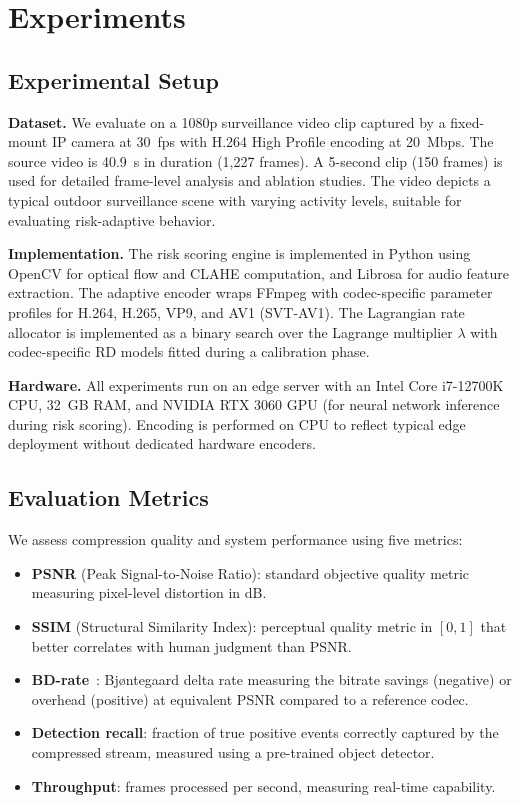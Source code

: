 \section{Experiments}
\label{sec:experiments}

\subsection{Experimental Setup}

\textbf{Dataset.} We evaluate on a 1080p surveillance video clip captured by a fixed-mount IP camera at 30~fps with H.264 High Profile encoding at 20~Mbps. The source video is 40.9~s in duration (1{,}227 frames). A 5-second clip (150 frames) is used for detailed frame-level analysis and ablation studies. The video depicts a typical outdoor surveillance scene with varying activity levels, suitable for evaluating risk-adaptive behavior.

\textbf{Implementation.} The risk scoring engine is implemented in Python using OpenCV for optical flow and CLAHE computation, and Librosa for audio feature extraction. The adaptive encoder wraps FFmpeg with codec-specific parameter profiles for H.264, H.265, VP9, and AV1 (SVT-AV1). The Lagrangian rate allocator is implemented as a binary search over the Lagrange multiplier $\lambda$ with codec-specific RD models fitted during a calibration phase.

\textbf{Hardware.} All experiments run on an edge server with an Intel Core i7-12700K CPU, 32~GB RAM, and NVIDIA RTX 3060 GPU (for neural network inference during risk scoring). Encoding is performed on CPU to reflect typical edge deployment without dedicated hardware encoders.

\subsection{Evaluation Metrics}

We assess compression quality and system performance using five metrics:

\begin{itemize}
    \item \textbf{PSNR} (Peak Signal-to-Noise Ratio): standard objective quality metric measuring pixel-level distortion in dB.
    \item \textbf{SSIM} (Structural Similarity Index): perceptual quality metric in $[0, 1]$ that better correlates with human judgment than PSNR.
    \item \textbf{BD-rate}~\cite{bjontegaard2001bd}: Bj{\o}ntegaard delta rate measuring the bitrate savings (negative) or overhead (positive) at equivalent PSNR compared to a reference codec.
    \item \textbf{Detection recall}: fraction of true positive events correctly captured by the compressed stream, measured using a pre-trained object detector.
    \item \textbf{Throughput}: frames processed per second, measuring real-time capability.
\end{itemize}

